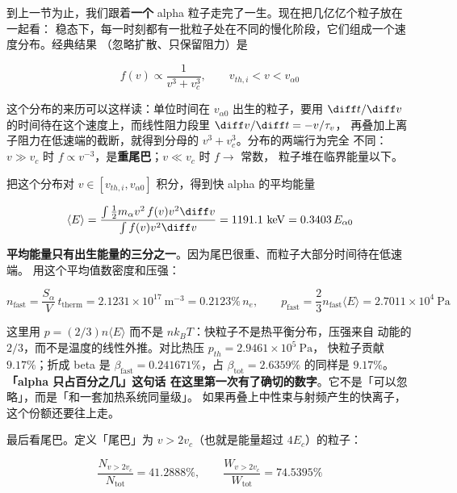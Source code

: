到上一节为止，我们跟着\textbf{一个} alpha 粒子走完了一生。现在把几亿亿个粒子放在一起看：
稳态下，每一时刻都有一批粒子处在不同的慢化阶段，它们组成一个速度分布。经典结果
（忽略扩散、只保留阻力）是

\begin{equation}
f(v) \propto \frac{1}{v^3+v_c^3}, \qquad v_{th,i} < v < v_{\alpha 0}
\label{eq:app-w-dist}
\end{equation}

这个分布的来历可以这样读：单位时间在 $v_{\alpha 0}$ 出生的粒子，要用
$\diff t/\diff v$ 的时间待在这个速度上，而线性阻力段里 $\diff v/\diff t=-v/\tau_v$，
再叠加上离子阻力在低速端的截断，就得到分母的 $v^3+v_c^3$。分布的两端行为完全
不同：$v\gg v_c$ 时 $f\propto v^{-3}$，是\textbf{重尾巴}；$v\ll v_c$ 时 $f\to$ 常数，
粒子堆在临界能量以下。

把这个分布对 $v\in[v_{th,i},v_{\alpha 0}]$ 积分，得到快 alpha 的平均能量

\begin{equation}
\langle E\rangle = \frac{\int \frac12 m_\alpha v^2\,f(v)v^2\diff v}
{\int f(v)v^2\diff v} = 1191.1\ \mathrm{keV} = 0.3403\,E_{\alpha 0}
\label{eq:app-w-meanE}
\end{equation}

\textbf{平均能量只有出生能量的三分之一}。因为尾巴很重、而粒子大部分时间待在低速端。
用这个平均值数密度和压强：

\begin{equation}
n_{\text{fast}} = \frac{S_\alpha}{V}\,t_{\text{therm}} = 2.1231\times10^{17}\ \mathrm{m^{-3}}
= 0.2123\%\,n_e, \qquad
p_{\text{fast}} = \frac{2}{3}n_{\text{fast}}\langle E\rangle
= 2.7011\times10^{4}\ \mathrm{Pa}
\label{eq:app-w-pfast}
\end{equation}

这里用 $p=(2/3)n\langle E\rangle$ 而不是 $nk_BT$：快粒子不是热平衡分布，压强来自
动能的 $2/3$，而不是温度的线性外推。对比热压 $p_{th}=2.9461\times10^{5}\ \mathrm{Pa}$，
快粒子贡献 $9.17\%$；折成 beta 是 $\beta_{\text{fast}}=0.241671\%$，占
$\beta_{\text{tot}}=2.6359\%$ 的同样是 $9.17\%$。\textbf{「alpha 只占百分之几」这句话
在这里第一次有了确切的数字}。它不是「可以忽略」，而是「和一套加热系统同量级」。
如果再叠上中性束与射频产生的快离子，这个份额还要往上走。

最后看尾巴。定义「尾巴」为 $v>2v_c$（也就是能量超过 $4E_c$）的粒子：

\begin{equation}
\frac{N_{v>2v_c}}{N_{\text{tot}}} = 41.2888\%, \qquad
\frac{W_{v>2v_c}}{W_{\text{tot}}} = 74.5395\%
\label{eq:app-w-tail}
\end{equation}

